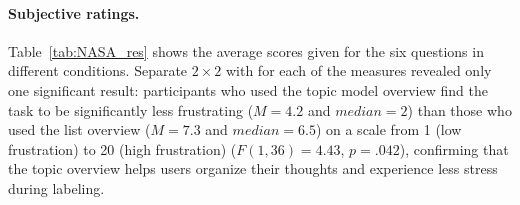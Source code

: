 \begin{table}[t!]
\caption{
Mean, standard deviation, and median results from 
 post-survey. All questions are scaled 1 (low)--20 (high), except performance, which is scaled 1 (good)--20 (poor). Users found topic model overview conditions,  and , to be significantly less frustrating than the list overview conditions.}
\label{tab:NASA_res}
\end{table}

\paragraph{Subjective ratings.}

Table~\ref{tab:NASA_res} shows the average scores given for the six
 questions in different conditions. Separate $2\times2$
 with  for each of the measures revealed only one
significant result: participants who used the topic model overview find the
task to be significantly less frustrating (\mbox{$M=4.2$} and \mbox{$median=2$})
than those who used the list overview (\mbox{$M=7.3$} and \mbox{$median=6.5$})
on a scale from 1 (low frustration) to 20 (high frustration)
(\mbox{$F(1,36)=4.43$}, \mbox{$p=.042$}), confirming that the topic overview
helps users organize their thoughts and experience less stress during labeling.


